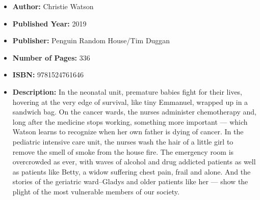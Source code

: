 \documentclass{tufte-handout}
\begin{document}
\begin{itemize}
    \item[] \textbf{Author:} Christie Watson
    \item[] \textbf{Published Year:} 2019 
    \item[] \textbf{Publisher:} Penguin Random House/Tim Duggan
    \item[] \textbf{Number of Pages:} 336 
    \item[] \textbf{ISBN:} 9781524761646
    \item[] \textbf{Description:} In the neonatal unit, premature babies fight for their lives, hovering at the very edge of survival, like tiny Emmanuel, wrapped up in a sandwich bag. On the cancer wards, the nurses administer chemotherapy and, long after the medicine stops working, something more important --- which Watson learns to recognize when her own father is dying of cancer. In the pediatric intensive care unit, the nurses wash the hair of a little girl to remove the smell of smoke from the house fire. The emergency room is overcrowded as ever, with waves of alcohol and drug addicted patients as well as patients like Betty, a widow suffering chest pain, frail and alone. And the stories of the geriatric ward–Gladys and older patients like her --- show the plight of the most vulnerable members of our society.


\end{itemize}
\end{document}
